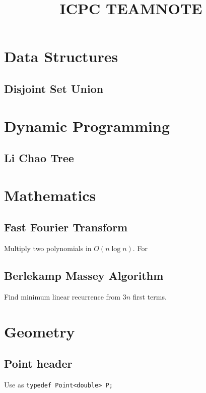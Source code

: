 \documentclass[landscape]{article}
\title{\Huge{\textsf{ICPC TEAMNOTE}}}
\author{}
\date{ }
\begin{document}
\newpage
\begin{multicols}{2}\raggedcolumns
    \tableofcontents
    \pagebreak
\end{multicols}
\begin{multicols}{2}\raggedcolumns


\section{Data Structures}
    \subsection{Disjoint Set Union}
        

\section{Dynamic Programming}
    \subsection{Li Chao Tree}
        

\section{Mathematics}
    \subsection{Fast Fourier Transform}
        Multiply two polynomials in $O(n \log n)$. For
        

    \subsection{Berlekamp Massey Algorithm}
        Find minimum linear recurrence from $3n$ first terms.
        

\section{Geometry}
    \subsection{Point header}
        Use as \texttt{typedef Point<double> P;}
        

\end{multicols}
\end{document}
